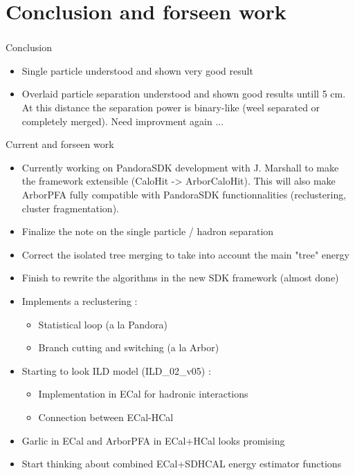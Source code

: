 \documentclass[8pt]{beamer}
\begin{document}
  
  \section{Conclusion and forseen work}
  
  \begin{frame}
  \frametitle{\secname}
  
    \begin{block}{Conclusion}
      \begin{itemize}
        \item Single particle understood and shown very good result
        \item Overlaid particle separation understood and shown good results untill 5 cm. At this distance the separation power is binary-like (weel separated or completely merged). Need improvment again ...
      \end{itemize}
    \end{block}
    
    \begin{block}{Current and forseen work}
      \begin{itemize}
        \item Currently working on PandoraSDK development with J. Marshall to make the framework extensible (CaloHit -> ArborCaloHit). This will also make ArborPFA fully compatible with PandoraSDK functionnalities (reclustering, cluster fragmentation).
        \item Finalize the note on the single particle / hadron separation
        \item Correct the isolated tree merging to take into account the main "tree" energy
        \item Finish to rewrite the algorithms in the new SDK framework (almost done)
        \item Implements a reclustering :
        \begin{itemize}
          \item Statistical loop (a la Pandora)
          \item Branch cutting and switching (a la Arbor)
        \end{itemize} 
        \item Starting to look ILD model (ILD\_02\_v05) :
        \begin{itemize}
          \item Implementation in ECal for hadronic interactions
          \item Connection between ECal-HCal
        \end{itemize}
          \item Garlic in ECal and ArborPFA in ECal+HCal looks promising
          \item Start thinking about combined ECal+SDHCAL energy estimator functions
      \end{itemize}
    \end{block}
    
  \end{frame}
\end{document}
